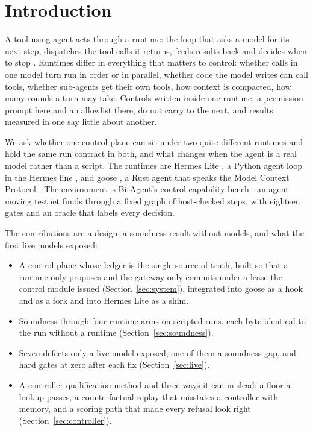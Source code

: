 \documentclass[11pt]{article}
\begin{document}
\section{Introduction}

A tool-using agent acts through a runtime: the loop that asks a model for its next step, dispatches the tool calls it returns, feeds results back and decides when to stop \citep{yao2023react,schick2023toolformer}. Runtimes differ in everything that matters to control: whether calls in one model turn run in order or in parallel, whether code the model writes can call tools, whether sub-agents get their own tools, how context is compacted, how many rounds a turn may take. Controls written inside one runtime, a permission prompt here and an allowlist there, do not carry to the next, and results measured in one say little about another.

We ask whether one control plane can sit under two quite different runtimes and hold the same run contract in both, and what changes when the agent is a real model rather than a script. The runtimes are Hermes Lite \citep{hermeslite2026}, a Python agent loop in the Hermes line \citep{teknium2024hermes3}, and goose \citep{goose2025}, a Rust agent that speaks the Model Context Protocol \citep{mcp2024}. The environment is BitAgent's control-capability bench \citep{bitagent2026}: an agent moving testnet funds through a fixed graph of host-checked steps, with eighteen gates and an oracle that labels every decision.

The contributions are a design, a soundness result without models, and what the first live models exposed:
\begin{itemize}[leftmargin=1.2em,itemsep=2pt]
\item A control plane whose ledger is the single source of truth, built so that a runtime only proposes and the gateway only commits under a lease the control module issued (Section~\ref{sec:system}), integrated into goose as a hook and as a fork and into Hermes Lite as a shim.
\item Soundness through four runtime arms on \soundRunsTotal{} scripted runs, each byte-identical to the run without a runtime (Section~\ref{sec:soundness}).
\item Seven defects only a live model exposed, one of them a soundness gap, and hard gates at zero after each fix (Section~\ref{sec:live}).
\item A controller qualification method and three ways it can mislead: a floor a lookup passes, a counterfactual replay that misstates a controller with memory, and a scoring path that made every refusal look right (Section~\ref{sec:controller}).
\end{itemize}
\end{document}
